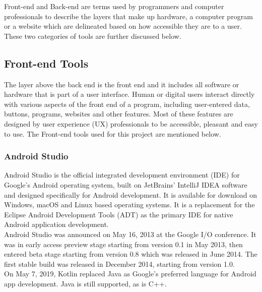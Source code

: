 \documentclass[14pt]{report}
\begin{document}
			Front-end and Back-end are terms used by programmers and computer professionals to describe the layers that make up hardware, a computer program or a website which are delineated based on how accessible they are to a user. These two categories of tools are further discussed below. 
			\subsection{Front-end Tools}
				The layer above the back end is the front end and it includes all software or hardware that is part of a user interface. Human or digital users interact directly with various aspects of the front end of a program, including user-entered data, buttons, programs, websites and other features. Most of these features are designed by user experience (UX) professionals to be accessible, pleasant and easy to use. The Front-end tools used for this project are mentioned below.
				\subsubsection{Android Studio}
				Android Studio is the official integrated development environment (IDE) for Google's Android operating system, built on JetBrains' IntelliJ IDEA software and designed specifically for Android development. It is available for download on Windows, macOS and Linux based operating systems. It is a replacement for the Eclipse Android Development Tools (ADT) as the primary IDE for native Android application development.\\

				Android Studio was announced on May 16, 2013 at the Google I/O conference. It was in early access preview stage starting from version 0.1 in May 2013, then entered beta stage starting from version 0.8 which was released in June 2014. The first stable build was released in December 2014, starting from version 1.0.\\
				
				On May 7, 2019, Kotlin replaced Java as Google’s preferred language for Android app development. Java is still supported, as is C++.\\ 
				
\end{document}
